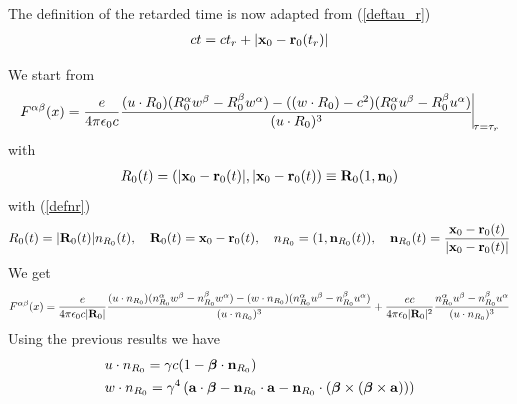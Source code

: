 The definition of the retarded time is now adapted from (\ref{deftau_r})
\begin{align}
    ct = ct_r +|{\bf x}_0-{\bf r}_0(t_r)|\label{crt}
\end{align}

We start from
\begin{align}
    F^{\alpha\beta}(x)={\frac{e}{4\pi\epsilon_0c}\frac{(u\cdot R_0)(R_0^{\alpha}w^{\beta}-R_0^{\beta}w^{\alpha})-((w\cdot R_0)-c^2)(R_0^{\alpha}u^{\beta}-R_0^{\beta}u^{\alpha})}{(u\cdot R_0)^3}\vline}_{\tau=\tau_r}
\end{align}
with
\begin{align}
    R_0(t)=(|{\bf x}_0-{\bf r}_0(t)|, |{\bf x}_0-{\bf r}_0(t))\equiv {\bf R}_0 (1,{\bf n}_0)
\end{align}
with (\ref{defnr})
\begin{align}
    R_0(t)=|{\bf R}_0(t)|n_{R_0}(t),\quad {\bf R}_0(t)={\bf x}_0-{\bf r}_0(t),\quad n_{R_0}=(1,{\bf n}_{R_0}(t)),\quad {\bf n}_{R_0}(t)=\frac{{\bf x}_0-{\bf r}_0(t)}{|{\bf x}_0-{\bf r}_0(t)|}\label{defnr-t}
\end{align}
We get
\begin{align}
    F^{\alpha\beta}(x)=\frac{e}{4\pi\epsilon_0c |{\bf R}_0|}\frac{(u\cdot n_{R_0})(n_{R_0}^{\alpha}w^{\beta}-n_{R_0}^{\beta}w^{\alpha})-(w\cdot n_{R_0})(n_{R_0}^{\alpha}u^{\beta}-n_{R_0}^{\beta}u^{\alpha})}{(u\cdot n_{R_0})^3}+\frac{ec}{4\pi\epsilon_0 |{\bf R}_0|^2}\frac{n_{R_0}^{\alpha}u^\beta-n_{R_0}^{\beta}u^\alpha}{(u\cdot n_{R_0})^3}
\end{align}
Using the previous results we have
\begin{align}
     & u\cdot n_{R_0}=\gamma c(1-{\boldsymbol\beta}\cdot{\bf n}_{R_0})                                                                                                                   \\
     & w\cdot n_{R_0} =\gamma^4 \left({\bf a}\cdot{\boldsymbol\beta}-{\bf n}_{R_0}\cdot{\bf a}- {\bf n}_{R_0}\cdot({\boldsymbol\beta}\times({\boldsymbol\beta}\times {\bf a}))\right)
\end{align}

